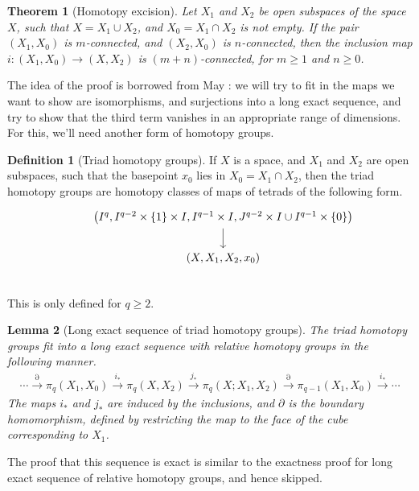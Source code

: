 \documentclass[12pt, notitlepage]{article}
\newtheorem{thm}{Theorem}[section]
\newtheorem{lem}[thm]{Lemma}
\theoremstyle{definition}
\newtheorem{defn}{Definition}[section]
\begin{document}
\begin{thm}[Homotopy excision]
  Let $X_1$ and $X_2$ be open subspaces of the space $X$, such that $X = X_1 \cup X_2$,
  and $X_0 = X_1 \cap X_2$ is not empty. If the pair $(X_1, X_0)$ is $m$-connected,
  and $(X_2, X_0)$ is $n$-connected, then the inclusion map $i: (X_1, X_0) \to (X, X_2)$
  is $(m+n)$-connected, for $m \geq 1$ and $n \geq 0$.
\end{thm}
The idea of the proof is borrowed from May : we will try to
fit in the maps we want to show are isomorphisms, and surjections into a long exact sequence,
and try to show that the third term vanishes in an appropriate range of dimensions. For this,
we'll need another form of homotopy groups.

\begin{defn}[Triad homotopy groups]
  If $X$ is a space, and $X_1$ and $X_2$ are open subspaces, such that the basepoint $x_0$
  lies in $X_0 = X_1 \cap X_2$, then the triad homotopy groups are homotopy classes of maps
  of tetrads of the following form.
  \[
    \begin{tikzcd}
      &\left( I^q, I^{q-2} \times \{1\} \times I, I^{q-1} \times I, J^{q-2} \times I \cup I^{q-1} \times \{0\} \right) \ar[d] \\
      &(X, X_1, X_2, x_0) \\
    \end{tikzcd}
  \]
  This is only defined for $q \geq 2$.
\end{defn}

\begin{lem}[Long exact sequence of triad homotopy groups]
  The triad homotopy groups fit into a long exact sequence with relative homotopy groups in the
  following manner.
  \begin{align*}
    \cdots \xrightarrow{\partial} \pi_q(X_1, X_0) \xrightarrow{i_{\ast}} \pi_q(X, X_2)
    \xrightarrow{j_{\ast}} \pi_q(X; X_1, X_2) \xrightarrow{\partial} \pi_{q-1}(X_1, X_0) \xrightarrow{i_{\ast}} \cdots
  \end{align*}
  The maps $i_{\ast}$ and $j_{\ast}$ are induced by the inclusions, and $\partial$ is the boundary homomorphism,
  defined by restricting the map to the face of the cube corresponding to $X_1$.
\end{lem}
  The proof that this sequence is exact is similar to the exactness proof for long exact sequence of relative homotopy
  groups, and hence skipped.
\end{document}
